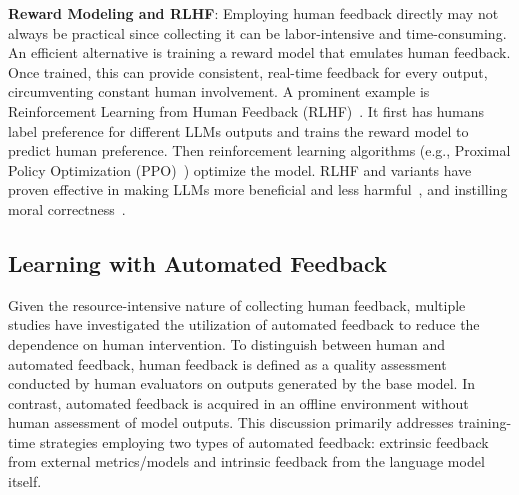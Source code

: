 \documentclass[a4paper,oneside]{book}
\begin{document}
\textbf{Reward Modeling and RLHF}: Employing human feedback directly may not always be practical since collecting it can be labor-intensive and time-consuming. An efficient alternative is training a reward model that emulates human feedback. Once trained, this can provide consistent, real-time feedback for every output, circumventing constant human involvement. A prominent example is Reinforcement Learning from Human Feedback (RLHF)~\cite{ouyang2022training}. It first has humans label preference for different LLMs outputs and trains the reward model to predict human preference. Then reinforcement learning algorithms (e.g., Proximal Policy Optimization (PPO)~\cite{schulman2017proximal}) optimize the model. RLHF and variants have proven effective in making LLMs more beneficial and less harmful~\cite{bai2022training}, and instilling moral correctness~\cite{ganguli2023capacity}.

\subsection{Learning with Automated Feedback}
Given the resource-intensive nature of collecting human feedback, multiple studies have investigated the utilization of automated feedback to reduce the dependence on human intervention. To distinguish between human and automated feedback, human feedback is defined as a quality assessment conducted by human evaluators on outputs generated by the base model. In contrast, automated feedback is acquired in an offline environment without human assessment of model outputs. This discussion primarily addresses training-time strategies employing two types of automated feedback: extrinsic feedback from external metrics/models and intrinsic feedback from the language model itself.
\end{document}
